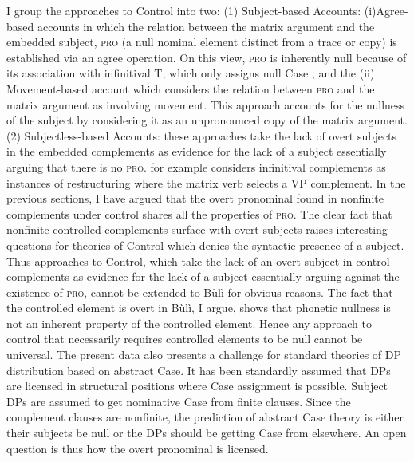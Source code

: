 \documentclass[output=paper,colorlinks,citecolor=brown]{langscibook}
\begin{document}
I group the approaches to Control into two: (1) Subject-based Accounts: (i)Agree-based accounts \citet{Landau2001, Landau2013} in which the relation between the matrix argument and the embedded subject, \textsc{pro} (a null nominal element distinct from a trace or copy) is established via an agree operation. On this view, \textsc{pro} is inherently null because of its association with infinitival T, which only assigns null Case \citep{ChomskyLasnik1993}, and the (ii) Movement-based account \citep{Hornstein1999} which considers the relation between \textsc{pro} and the matrix argument as involving movement. This approach accounts for the nullness of the subject by considering it as an unpronounced copy of the matrix argument. (2) Subjectless-based Accounts: these approaches take the lack of overt subjects in the embedded complements as evidence for the lack of a subject \citep{Bresnan1982, Dowty1985, JackendoffCulicover2003, Wurmbrand1998, Wurmbrand2004, Chierchia1989} essentially arguing that there is no \textsc{pro}. \citet{Wurmbrand1998, Wurmbrand2004} for example considers infinitival complements as instances of restructuring where the matrix verb selects a VP complement.  
In the previous sections, I have argued that the overt pronominal found in nonfinite complements under control shares all the properties of \textsc{pro}. The clear fact that nonfinite controlled complements surface with overt subjects raises interesting questions for theories of Control which denies the syntactic presence of a subject. Thus approaches to Control, which take the lack of an overt subject in control complements as evidence for the lack of a subject essentially arguing against the existence of \textsc{pro}, cannot be extended to Bùlì for obvious reasons. The fact that the controlled element is overt in Bùlì, I argue, shows that phonetic nullness is not an inherent property of the controlled element. Hence any approach to control that necessarily requires controlled elements to be null cannot be universal. 
The present data also presents a challenge for standard theories of DP  distribution based on abstract Case. It has been standardly assumed that DPs are licensed in structural positions where Case assignment is possible. Subject DPs are assumed to get nominative Case from  finite clauses. Since the complement clauses are nonfinite, the prediction of abstract Case theory is either their subjects be null or the DPs should be getting Case from elsewhere. An open question is thus how the overt pronominal is licensed.\\
\end{document}
